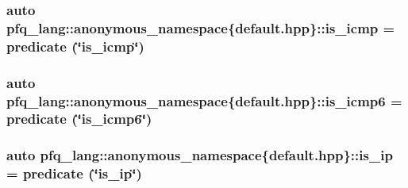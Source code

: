 \hypertarget{namespacepfq__lang_1_1anonymous__namespace_02default_8hpp_03_aecfdadd54cbd2d4e93a7f246b6bcd0fc}{
\subsubsection[{is\-\_\-icmp}]{\setlength{\rightskip}{0pt plus 5cm}auto pfq\-\_\-lang\-::anonymous\-\_\-namespace\{default.\-hpp\}\-::is\-\_\-icmp = {\bf predicate} (\char`\"{}is\-\_\-icmp\char`\"{})}}\label{namespacepfq__lang_1_1anonymous__namespace_02default_8hpp_03_aecfdadd54cbd2d4e93a7f246b6bcd0fc}
\hypertarget{namespacepfq__lang_1_1anonymous__namespace_02default_8hpp_03_abbce0d21ac217034eac2cd1366f78695}{
\subsubsection[{is\-\_\-icmp6}]{\setlength{\rightskip}{0pt plus 5cm}auto pfq\-\_\-lang\-::anonymous\-\_\-namespace\{default.\-hpp\}\-::is\-\_\-icmp6 = {\bf predicate} (\char`\"{}is\-\_\-icmp6\char`\"{})}}\label{namespacepfq__lang_1_1anonymous__namespace_02default_8hpp_03_abbce0d21ac217034eac2cd1366f78695}
\hypertarget{namespacepfq__lang_1_1anonymous__namespace_02default_8hpp_03_a43ee18537268245a58354e044a134df5}{
\subsubsection[{is\-\_\-ip}]{\setlength{\rightskip}{0pt plus 5cm}auto pfq\-\_\-lang\-::anonymous\-\_\-namespace\{default.\-hpp\}\-::is\-\_\-ip = {\bf predicate} (\char`\"{}is\-\_\-ip\char`\"{})}}\label{namespacepfq__lang_1_1anonymous__namespace_02default_8hpp_03_a43ee18537268245a58354e044a134df5}
